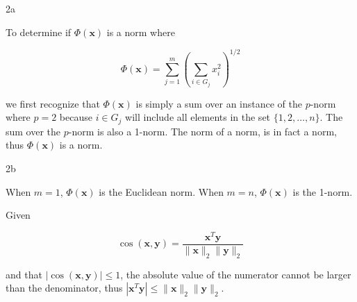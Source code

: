 \documentclass{article}
\begin{document}
\begin{homeworkProblem}

    \begin{homeworkSection}{2a}

        To determine if $\Phi(\bm{x})$ is a norm where 

        \begin{equation}
            \Phi(\bm{x}) = \sum_{j=1}^m \left(\sum_{i\in G_j} x_i^2
            \right)^{1/2}
        \end{equation}

        \noindent we first recognize that $\Phi(\bm{x})$ is simply a sum over
        an instance of the $p$-norm where $p = 2$ because $i \in G_j$ will
        include all elements in the set $\{1, 2, \dots, n\}$. The sum over the
        $p$-norm is also a 1-norm. The norm of a norm, is in fact a norm, thus
        $\Phi(\bm{x})$ is a norm.
        
    \end{homeworkSection}

    \begin{homeworkSection}{2b}

        When $m = 1$, $\Phi(\bm{x})$ is the Euclidean norm.
        When $m = n$, $\Phi(\bm{x})$ is the 1-norm.

    \end{homeworkSection}

\end{homeworkProblem}

\begin{homeworkProblem}

    Given 
    
    \begin{equation}
        \cos(\bm{x},\bm{y}) = \frac{\bm{x}^T\bm{y}}{\|\bm{x}\|_2 \|\bm{y}\|_2}
    \end{equation}

    \noindent and that $|\cos(\bm{x},\bm{y})| \leq 1$, the absolute value of
    the numerator cannot be larger than the denominator, thus $|\bm{x}^T\bm{y}|
    \leq \|\bm{x}\|_2 \|\bm{y}\|_2$.

\end{homeworkProblem}
\end{document}
